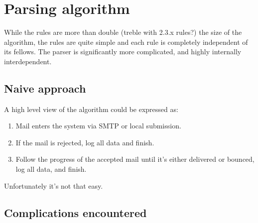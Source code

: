 \documentclass[a4paper,12pt,draft]{article}
\begin{document}
\section{Parsing algorithm}

While the rules are more than double (treble with 2.3.x rules?) the size of
the algorithm, the rules are quite simple and each rule is completely
independent of its fellows.  The parser is significantly more complicated,
and highly internally interdependent.


\subsection{Naive approach}

A high level view of the algorithm could be expressed as:

\begin{enumerate}

    \item Mail enters the system via SMTP or local submission.

    \item If the mail is rejected, log all data and finish.

    \item Follow the progress of the accepted mail until it's either delivered or
        bounced, log all data, and finish.

\end{enumerate}

Unfortunately it's not that easy.


\subsection{Complications encountered}
\end{document}
